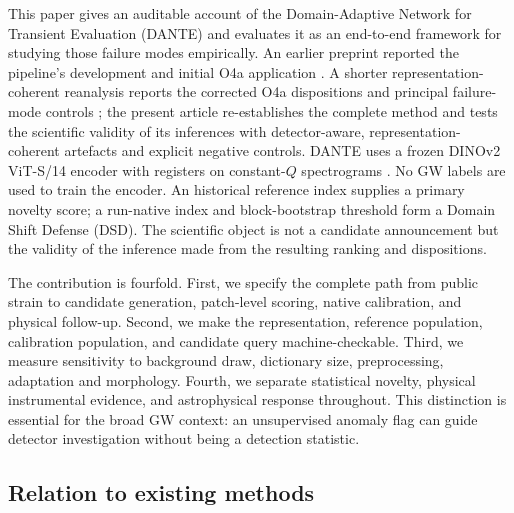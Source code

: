 \documentclass[12pt]{article}
\begin{document}
This paper gives an auditable account of the Domain-Adaptive Network for
Transient Evaluation (DANTE) and evaluates it as an
end-to-end framework for studying those failure modes empirically.  An earlier
preprint reported the pipeline's development and initial O4a application
\cite{dante_v1}.  A shorter representation-coherent reanalysis reports the
corrected O4a dispositions and principal failure-mode controls
\cite{dante_reanalysis}; the present article re-establishes the complete method
and tests the scientific validity of its inferences with detector-aware,
representation-coherent artefacts and explicit negative controls.  DANTE uses a frozen
DINOv2 ViT-S/14 encoder with registers \cite{oquab2024,darcet2024} on
constant-$Q$ spectrograms \cite{chatterji2004}.  No GW labels are used to train
the encoder.  An historical reference index supplies a primary novelty score;
a run-native index and block-bootstrap threshold form a Domain Shift Defense
(DSD).  The scientific object is not a candidate announcement but the validity
of the inference made from the resulting ranking and dispositions.

The contribution is fourfold.  First, we specify the complete path from public
strain to candidate generation, patch-level scoring, native calibration, and
physical follow-up.  Second, we make the representation, reference population,
calibration population, and candidate query machine-checkable.  Third, we
measure sensitivity to background draw, dictionary size, preprocessing,
adaptation and morphology.  Fourth, we separate statistical novelty, physical
instrumental evidence, and astrophysical response throughout.  This
distinction is essential for the broad GW context: an unsupervised anomaly
flag can guide detector investigation without being a detection statistic.

\subsection{Relation to existing methods}
\end{document}
